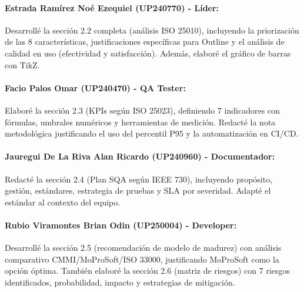 \documentclass[12pt]{article}
\begin{document}
\paragraph{Estrada Ramírez Noé Ezequiel (UP240770) - Líder:}
Desarrollé la sección 2.2 completa (análisis ISO 25010), incluyendo la priorización de las 8 características, justificaciones específicas para Outline y el análisis de calidad en uso (efectividad y satisfacción). Además, elaboré el gráfico de barras con TikZ.

\paragraph{Facio Palos Omar (UP240470) - QA Tester:}
Elaboré la sección 2.3 (KPIs según ISO 25023), definiendo 7 indicadores con fórmulas, umbrales numéricos y herramientas de medición. Redacté la nota metodológica justificando el uso del percentil P95 y la automatización en CI/CD.

\paragraph{Jauregui De La Riva Alan Ricardo (UP240960) - Documentador:}
Redacté la sección 2.4 (Plan SQA según IEEE 730), incluyendo propósito, gestión, estándares, estrategia de pruebas y SLA por severidad. Adapté el estándar al contexto del equipo.

\paragraph{Rubio Viramontes Brian Odin (UP250004) - Developer:}
Desarrollé la sección 2.5 (recomendación de modelo de madurez) con análisis comparativo CMMI/MoProSoft/ISO 33000, justificando MoProSoft como la opción óptima. También elaboré la sección 2.6 (matriz de riesgos) con 7 riesgos identificados, probabilidad, impacto y estrategias de mitigación.

\newpage
\printbibliography[title={Referencias}]
\end{document}
